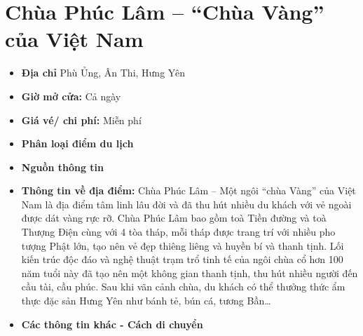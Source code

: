 \documentclass{article}
\begin{document}
\section{Chùa Phúc Lâm – “Chùa Vàng” của Việt Nam}
\begin{itemize}
    \item{\textbf{Địa chỉ}} Phù Ủng, Ân Thi, Hưng Yên

    \item{\textbf{Giờ mở cửa:}} Cả ngày

    \item{\textbf{Giá vé/ chi phí:}} Miễn phí

    \item{\textbf{Phân loại điểm du lịch}}

    \item{\textbf{Nguồn thông tin}}

    \item{\textbf{Thông tin về địa điểm:}} Chùa Phúc Lâm – Một ngôi “chùa Vàng” của Việt Nam là địa điểm tâm linh lâu đời và đã thu hút nhiều du khách với vẻ ngoài được dát vàng rực rỡ. Chùa Phúc Lâm bao gồm toà Tiền đường và toà Thượng Điện cùng với 4 tòa tháp, mỗi tháp được trang trí với nhiều pho tượng Phật lớn, tạo nên vẻ đẹp thiêng liêng và huyền bí và thanh tịnh. Lối kiến trúc độc đáo và nghệ thuật trạm trổ tinh tế của ngôi chùa cổ hơn 100 năm tuổi này đã tạo nên một không gian thanh tịnh, thu hút nhiều người đến cầu tài, cầu phúc. Sau khi vãn cảnh chùa, du khách có thể thưởng thức ẩm thực đặc sản Hưng Yên như bánh tẻ, bún cá, tương Bần…
\end{itemize}

\begin{itemize}
    \item{\textbf{Các thông tin khác - Cách di chuyển}}
\end{itemize}
\end{document}
